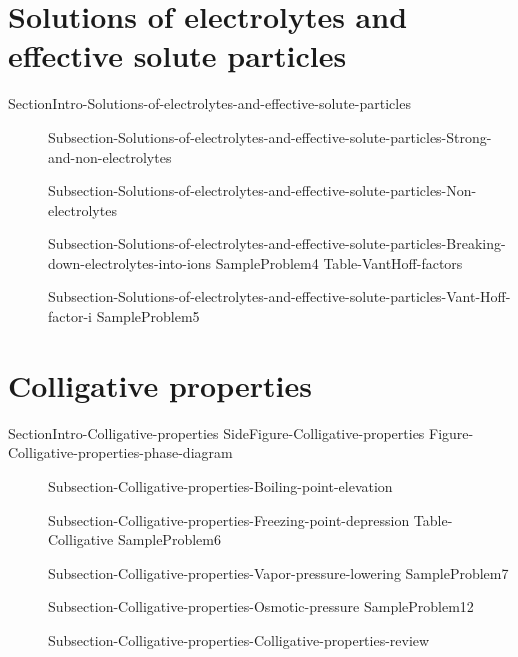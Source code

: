 \documentclass[main.tex]{subfiles}
\newcommand\chapterlabel{Ch-solutions}\setcounter{figurenewcounter}{0}\setcounter{tablenewcounter}{0}\setcounter{formulanewcounter}{0}\chapterpicture{../{\chapterlabel}/figure1}\chapterpicturelabel{PxFuel}
\begin{document}
\section{Solutions of electrolytes and effective solute particles}{SectionIntro-Solutions-of-electrolytes-and-effective-solute-particles}
\sloppy \begin{description}
\item[] {Subsection-Solutions-of-electrolytes-and-effective-solute-particles-Strong-and-non-electrolytes}
\item[] {Subsection-Solutions-of-electrolytes-and-effective-solute-particles-Non-electrolytes}
\item[] {Subsection-Solutions-of-electrolytes-and-effective-solute-particles-Breaking-down-electrolytes-into-ions}
{SampleProblem4}
{Table-VantHoff-factors}
\item[] {Subsection-Solutions-of-electrolytes-and-effective-solute-particles-Vant-Hoff-factor-i}
{SampleProblem5}
\end{description}


\section{Colligative properties}{SectionIntro-Colligative-properties}
{SideFigure-Colligative-properties}
{Figure-Colligative-properties-phase-diagram}
\sloppy \begin{description}
\item[] {Subsection-Colligative-properties-Boiling-point-elevation}
\item[] {Subsection-Colligative-properties-Freezing-point-depression}
{Table-Colligative}
{SampleProblem6}
\item[] {Subsection-Colligative-properties-Vapor-pressure-lowering}
{SampleProblem7}
\vspace{0cm}{Figure-Osmosis}
\item[] {Subsection-Colligative-properties-Osmotic-pressure}
{SampleProblem12}
\item[] {Subsection-Colligative-properties-Colligative-properties-review}
\end{description}
\end{document}
